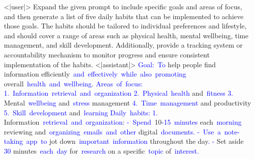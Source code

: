 \documentclass{article}
\begin{document}
\begin{tcolorbox}[colframe=black,colback=white]
<|user|>
Expand the given prompt to include specific goals and areas of focus, and then generate a list of five daily habits that can be implemented to achieve those goals. The habits should be tailored to individual preferences and lifestyle, and should cover a range of areas such as physical health, mental wellbeing, time management, and skill development. Additionally, provide a tracking system or accountability mechanism to monitor progress and ensure consistent implementation of the habits.
<|assistant|>
\textcolor{blue}{Goal}\textcolor{blue}{:}\textcolor{blue}{~To} help people find information efficiently\textcolor{blue}{~and}\textcolor{blue}{~effectively}\textcolor{blue}{~while}\textcolor{blue}{~also}\textcolor{blue}{~promoting} overall\textcolor{blue}{~health}\textcolor{blue}{~and}\textcolor{blue}{~wellbeing}.
\textcolor{blue}{Areas}\textcolor{blue}{~of}\textcolor{blue}{~focus}\textcolor{blue}{:
}\textcolor{blue}{1}\textcolor{blue}{.}\textcolor{blue}{~Information}\textcolor{blue}{~retrieval}\textcolor{blue}{~and}\textcolor{blue}{~organization}\textcolor{blue}{
}\textcolor{blue}{2}\textcolor{blue}{.}\textcolor{blue}{~Physical}\textcolor{blue}{~health} and\textcolor{blue}{~fitness}\textcolor{blue}{
}\textcolor{blue}{3}\textcolor{blue}{.} Mental\textcolor{blue}{~wellbeing} and\textcolor{blue}{~stress} management
\textcolor{blue}{4}\textcolor{blue}{.}\textcolor{blue}{~Time}\textcolor{blue}{~management} and productivity\textcolor{blue}{
}\textcolor{blue}{5}\textcolor{blue}{.}\textcolor{blue}{~Skill}\textcolor{blue}{~development} and\textcolor{blue}{~learning}
\textcolor{blue}{Daily}\textcolor{blue}{~habits}\textcolor{blue}{:
}\textcolor{blue}{1}\textcolor{blue}{.} Information\textcolor{blue}{~retrieval}\textcolor{blue}{~and}\textcolor{blue}{~organization}:
\textcolor{blue}{-}\textcolor{blue}{~Spend}\textcolor{blue}{~}10\textcolor{blue}{-}\textcolor{blue}{15}\textcolor{blue}{~minutes} each\textcolor{blue}{~morning} reviewing and\textcolor{blue}{~organizing}\textcolor{blue}{~emails}\textcolor{blue}{~and}\textcolor{blue}{~other} digital\textcolor{blue}{~documents}\textcolor{blue}{.
}\textcolor{blue}{-}\textcolor{blue}{~Use}\textcolor{blue}{~a}\textcolor{blue}{~note}\textcolor{blue}{-taking}\textcolor{blue}{~app}\textcolor{blue}{~to} jot down\textcolor{blue}{~important}\textcolor{blue}{~information} throughout the day\textcolor{blue}{.
}\textcolor{blue}{-} Set aside \textcolor{blue}{30} minutes\textcolor{blue}{~each}\textcolor{blue}{~day} for\textcolor{blue}{~research} on a specific\textcolor{blue}{~topic} of\textcolor{blue}{~interest}\textcolor{blue}{.
}
\end{tcolorbox}
\end{document}
